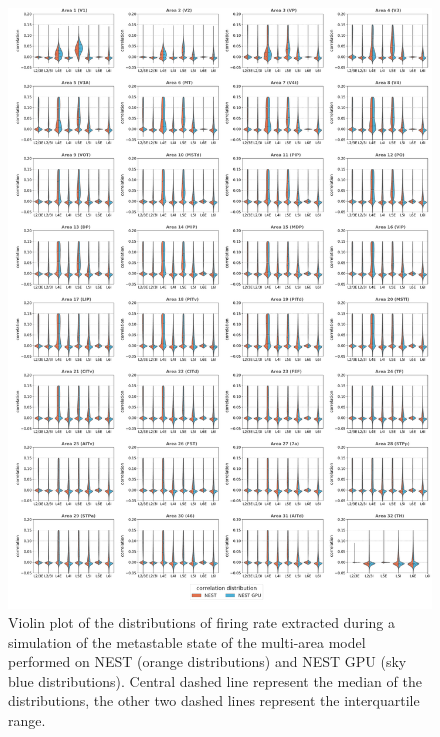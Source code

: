 \documentclass[a4paper, 12pt, twoside, openright]{book}
\begin{document}
\begin{figure}[H]
    \centering
    \includegraphics[width=\columnwidth]{figures/dist_violinplot_vert_ms_correlation.pdf}
    \caption{Violin plot of the distributions of firing rate extracted during a simulation of the metastable state of the multi-area model performed on NEST (orange distributions) and NEST GPU (sky blue distributions). Central dashed line represent the median of the distributions, the other two dashed lines represent the interquartile range.}
    \label{fig:mam_ms_dist}
\end{figure}
\end{document}
